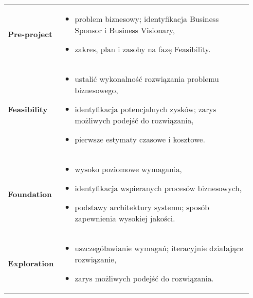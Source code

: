 \documentclass[../main.tex]{subfiles}
\begin{document}
    \begin{table}[H]
        \begin{center}
            \begin{tabular}{ p{} p{} }
                \textbf{Pre-project}
                &
                \begin{itemize}
                    \item problem biznesowy; identyfikacja Business Sponsor i Business Visionary,
                    \item zakres, plan i zasoby na fazę Feasibility.
                \end{itemize}
                \\

                \textbf{Feasibility}
                &
                \begin{itemize}
                    \item ustalić wykonalność rozwiązania problemu biznesowego,
                    \item identyfikacja potencjalnych zysków; zarys możliwych podejść do rozwiązania,
                    \item pierwsze estymaty czasowe i kosztowe.
                \end{itemize}
                \\

                \textbf{Foundation}
                &
                \begin{itemize}
                    \item wysoko poziomowe wymagania,
                    \item identyfikacja wspieranych procesów biznesowych,
                    \item podstawy architektury systemu; sposób zapewnienia wysokiej jakości.
                \end{itemize}
                \\

                \textbf{Exploration}
                &
                \begin{itemize}
                    \item uszczegóławianie wymagań; iteracyjnie działające rozwiązanie,
                    \item zarys możliwych podejść do rozwiązania.
                \end{itemize}
                \\


\end{tabular}
\end{center}
\end{table}
\end{document}
